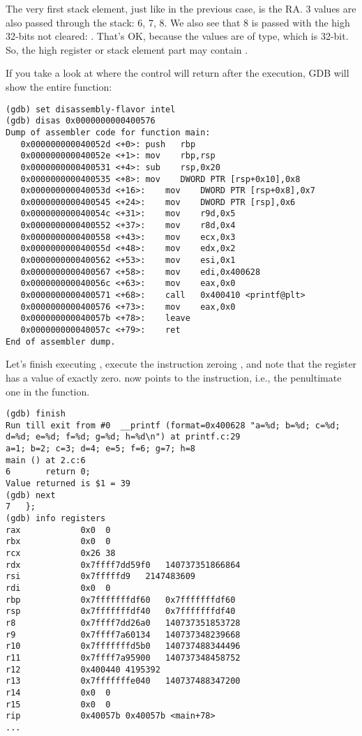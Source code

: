 The very first stack element, just like in the previous case, is the \ac{RA}.
3 values are also passed through the stack: 6, 7, 8.
We also see that 8 is passed with the high 32-bits not cleared: .
That's OK, because the values are of \Tint type, which is 32-bit.
So, the high register or stack element part may contain .

If you take a look at where the control will return after the \printf execution,
\ac{GDB} will show the entire \main function:

\begin{lstlisting}[style=customasmx86]
(gdb) set disassembly-flavor intel
(gdb) disas 0x0000000000400576
Dump of assembler code for function main:
   0x000000000040052d <+0>:	push   rbp
   0x000000000040052e <+1>:	mov    rbp,rsp
   0x0000000000400531 <+4>:	sub    rsp,0x20
   0x0000000000400535 <+8>:	mov    DWORD PTR [rsp+0x10],0x8
   0x000000000040053d <+16>:	mov    DWORD PTR [rsp+0x8],0x7
   0x0000000000400545 <+24>:	mov    DWORD PTR [rsp],0x6
   0x000000000040054c <+31>:	mov    r9d,0x5
   0x0000000000400552 <+37>:	mov    r8d,0x4
   0x0000000000400558 <+43>:	mov    ecx,0x3
   0x000000000040055d <+48>:	mov    edx,0x2
   0x0000000000400562 <+53>:	mov    esi,0x1
   0x0000000000400567 <+58>:	mov    edi,0x400628
   0x000000000040056c <+63>:	mov    eax,0x0
   0x0000000000400571 <+68>:	call   0x400410 <printf@plt>
   0x0000000000400576 <+73>:	mov    eax,0x0
   0x000000000040057b <+78>:	leave  
   0x000000000040057c <+79>:	ret    
End of assembler dump.
\end{lstlisting}

Let's finish executing \printf, execute the instruction
zeroing \EAX, and note that the \EAX register has a value of exactly zero.
\RIP now points to the  instruction, i.e., the penultimate one in the \main function.

\begin{lstlisting}
(gdb) finish
Run till exit from #0  __printf (format=0x400628 "a=%d; b=%d; c=%d; d=%d; e=%d; f=%d; g=%d; h=%d\n") at printf.c:29
a=1; b=2; c=3; d=4; e=5; f=6; g=7; h=8
main () at 2.c:6
6		return 0;
Value returned is $1 = 39
(gdb) next
7	};
(gdb) info registers
rax            0x0	0
rbx            0x0	0
rcx            0x26	38
rdx            0x7ffff7dd59f0	140737351866864
rsi            0x7fffffd9	2147483609
rdi            0x0	0
rbp            0x7fffffffdf60	0x7fffffffdf60
rsp            0x7fffffffdf40	0x7fffffffdf40
r8             0x7ffff7dd26a0	140737351853728
r9             0x7ffff7a60134	140737348239668
r10            0x7fffffffd5b0	140737488344496
r11            0x7ffff7a95900	140737348458752
r12            0x400440	4195392
r13            0x7fffffffe040	140737488347200
r14            0x0	0
r15            0x0	0
rip            0x40057b	0x40057b <main+78>
...
\end{lstlisting}
